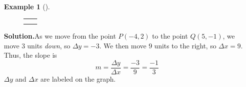 \documentclass[10pt,]{book}
\theoremstyle{plain}
\theoremstyle{definition}
\theoremstyle{definition}
\newtheorem{example}[theorem]{Example}
\theoremstyle{definition}
\theoremstyle{definition}
\numberwithin{equation}{part}
\newlength{\panelmax}
\begin{document}
\begin{example}[]\label{example-negative-slope}
{%
\setlength{\panelmax}{0pt}
\newsavebox{\panelboxAZEp}
\newlength{\phAZEp}\setlength{\phAZEp}{\ht\panelboxAZEp+\dp\panelboxAZEp}
\settototalheight{\phAZEp}{\usebox{\panelboxAZEp}}
\setlength{\panelmax}{\maxof{\panelmax}{\phAZEp}}
\newsavebox{\panelboxDQimage}
\newlength{\phDQimage}\setlength{\phDQimage}{\ht\panelboxDQimage+\dp\panelboxDQimage}
\settototalheight{\phDQimage}{\usebox{\panelboxDQimage}}
\setlength{\panelmax}{\maxof{\panelmax}{\phDQimage}}
\leavevmode%
\setlength{\tabcolsep}{0\textwidth}
\begin{figure}
\begin{tabular}{@{}*{2}{c}@{}}
\begin{minipage}[c][\panelmax][t]{0.5\textwidth}\usebox{\panelboxAZEp}\end{minipage}&
\begin{minipage}[c][\panelmax][t]{0.5\textwidth}\usebox{\panelboxDQimage}\end{minipage}\tabularnewline
&
\parbox[t]{0.5\textwidth}{
}\end{tabular}
\end{figure}
}%
\par\medskip\noindent%
\textbf{Solution.}\quad As we move from the point \(P(-4, 2)\) to the point \(Q(5, -1)\), we move \(3\) units \emph{down}, so \(\Delta y = -3\). We then move \(9\) units to the right, so \(\Delta x = 9\). Thus, the slope is%
\begin{equation*}
m = \frac{\Delta y}{\Delta x}=\frac{-3}{9}=\frac{-1}{3}
\end{equation*}
\(\Delta y\) and \(\Delta x\) are labeled on the graph.%
\end{example}
\end{document}
